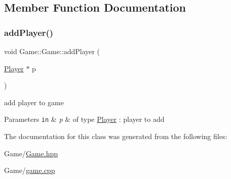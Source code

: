 \subsection{Member Function Documentation}
\mbox{\label{class_game_1_1_game_a8686480ec3d4c7bfcd3ad291dd9b0e68}} 
\subsubsection{\texorpdfstring{add\+Player()}{addPlayer()}}
{\footnotesize\ttfamily void Game\+::\+Game\+::add\+Player (\begin{DoxyParamCaption}\item[{\hyperlink{class_game_1_1_player}{Player} $\ast$}]{p }\end{DoxyParamCaption})}



add player to game 


\begin{DoxyParams}[1]{Parameters}
\mbox{\tt in}  & {\em p} & of type \hyperlink{class_game_1_1_player}{Player} \+: player to add \\
\hline
\end{DoxyParams}


The documentation for this class was generated from the following files\+:\begin{DoxyCompactItemize}
\item 
Game/\hyperlink{_game_8hpp}{Game.\+hpp}\item 
Game/\hyperlink{game_8cpp}{game.\+cpp}\end{DoxyCompactItemize}
